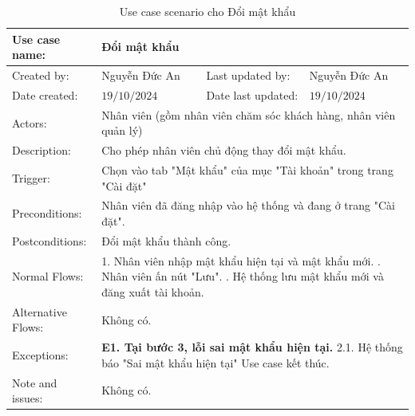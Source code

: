 \begin{table}[H]
	\centering
	\begin{tabular}{|l|l|l|l|} 
		\hline Use case name: & \multicolumn{3}{|l|}{Đổi mật khẩu} \\ 
		\hline Created by: & Nguyễn Đức An & Last updated by: & Nguyễn Đức An \\ 
		\hline Date created: & $19 / 10 / 2024$ & Date last updated: & $19 / 10 / 2024$\\ 
		\hline Actors: & \multicolumn{3}{|l|}{ Nhân viên (gồm nhân viên chăm sóc khách hàng, nhân viên quản lý) } \\ 
		\hline Description: & \multicolumn{3}{|p{12cm}|}{ Cho phép nhân viên chủ động thay đổi mật khẩu. } \\ 
		\hline Trigger: & \multicolumn{3}{|p{12cm}|}{ Chọn vào tab "Mật khẩu" của mục "Tài khoản" trong trang "Cài đặt"} \\ 
		\hline Preconditions: & \multicolumn{3}{|p{12cm}|}{ Nhân viên đã đăng nhập vào hệ thống và đang ở trang "Cài đặt". } \\ 
		\hline Postconditions: & \multicolumn{3}{|p{12cm}|}{ Đổi mật khẩu thành công. } \\ 
		\hline Normal Flows: & \multicolumn{3}{|p{12cm}|}{ 
			1. Nhân viên nhập mật khẩu hiện tại và mật khẩu mới. \newline 
			2. Nhân viên ấn nút "Lưu". \newline 
			3. Hệ thống lưu mật khẩu mới và đăng xuất tài khoản. 
		} \\ 
		\hline Alternative Flows: & \multicolumn{3}{|p{12cm}|}{ Không có. } \\ 
		\hline Exceptions: & \multicolumn{3}{|p{12cm}|}{ 
			\textbf{E1. Tại bước 3, lỗi sai mật khẩu hiện tại.} \newline 
			\hspace{0.5cm}2.1. Hệ thống báo "Sai mật khẩu hiện tại" \newline
            \hspace{0.5cm} Use case kết thúc. 
		} \\ 
		\hline Note and issues: & \multicolumn{3}{|p{12cm}|}{ Không có. } \\ 
		\hline
	\end{tabular}
	\caption{Use case scenario cho Đổi mật khẩu}
\end{table}






